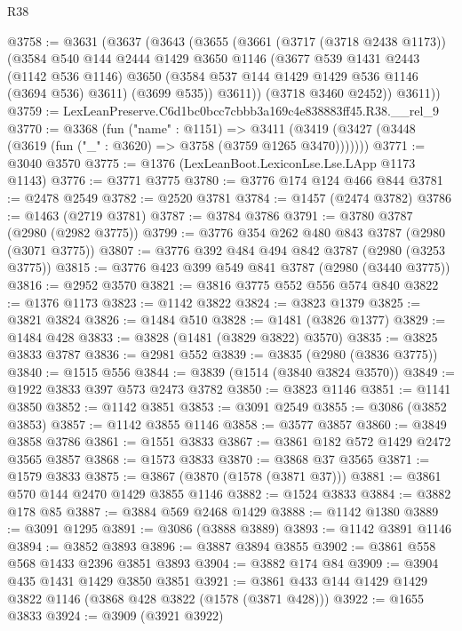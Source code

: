 \begin{lexlean}{R38}
\begin{coremodule}
@3758 := @3631
    (@3637
      (@3643
        (@3655
          (@3661
            (@3717 (@3718 @2438 @1173))
            (@3584
              @540
              @144
              @2444
              @1429
              @3650
              @1146
              (@3677
                @539
                @1431
                @2443
                (@1142 @536 @1146)
                @3650
                (@3584 @537 @144 @1429 @1429 @536 @1146 (@3694 @536) @3611)
                (@3699 @535))
              @3611))
          (@3718 @3460 @2452))
        @3611))
@3759 := LexLeanPreserve.C6d1bc0bcc7cbbb3a169c4e838883ff45.R38.__rel_9
@3770 := @3368
    (fun ("name" : @1151) =>
    @3411 (@3419 (@3427 (@3448 (@3619 (fun ("_" : @3620) => @3758 (@3759 @1265 @3470)))))))
@3771 := @3040 @3570
@3775 := @1376 (LexLeanBoot.LexiconLse.Lse.LApp @1173 @1143)
@3776 := @3771 @3775
@3780 := @3776 @174 @124 @466 @844
@3781 := @2478 @2549
@3782 := @2520 @3781
@3784 := @1457 (@2474 @3782)
@3786 := @1463 (@2719 @3781)
@3787 := @3784 @3786
@3791 := @3780 @3787 (@2980 (@2982 @3775))
@3799 := @3776 @354 @262 @480 @843 @3787 (@2980 (@3071 @3775))
@3807 := @3776 @392 @484 @494 @842 @3787 (@2980 (@3253 @3775))
@3815 := @3776 @423 @399 @549 @841 @3787 (@2980 (@3440 @3775))
@3816 := @2952 @3570
@3821 := @3816 @3775 @552 @556 @574 @840
@3822 := @1376 @1173
@3823 := @1142 @3822
@3824 := @3823 @1379
@3825 := @3821 @3824
@3826 := @1484 @510
@3828 := @1481 (@3826 @1377)
@3829 := @1484 @428
@3833 := @3828 (@1481 (@3829 @3822) @3570)
@3835 := @3825 @3833 @3787
@3836 := @2981 @552
@3839 := @3835 (@2980 (@3836 @3775))
@3840 := @1515 @556
@3844 := @3839 (@1514 (@3840 @3824 @3570))
@3849 := @1922 @3833 @397 @573 @2473 @3782
@3850 := @3823 @1146
@3851 := @1141 @3850
@3852 := @1142 @3851
@3853 := @3091 @2549
@3855 := @3086 (@3852 @3853)
@3857 := @1142 @3855 @1146
@3858 := @3577 @3857
@3860 := @3849 @3858 @3786
@3861 := @1551 @3833
@3867 := @3861 @182 @572 @1429 @2472 @3565 @3857
@3868 := @1573 @3833
@3870 := @3868 @37 @3565
@3871 := @1579 @3833
@3875 := @3867 (@3870 (@1578 (@3871 @37)))
@3881 := @3861 @570 @144 @2470 @1429 @3855 @1146
@3882 := @1524 @3833
@3884 := @3882 @178 @85
@3887 := @3884 @569 @2468 @1429
@3888 := @1142 @1380
@3889 := @3091 @1295
@3891 := @3086 (@3888 @3889)
@3893 := @1142 @3891 @1146
@3894 := @3852 @3893
@3896 := @3887 @3894 @3855
@3902 := @3861 @558 @568 @1433 @2396 @3851 @3893
@3904 := @3882 @174 @84
@3909 := @3904 @435 @1431 @1429 @3850 @3851
@3921 := @3861 @433 @144 @1429 @1429 @3822 @1146 (@3868 @428 @3822 (@1578 (@3871 @428)))
@3922 := @1655 @3833
@3924 := @3909 (@3921 @3922)

\end{coremodule}
\end{lexlean}
